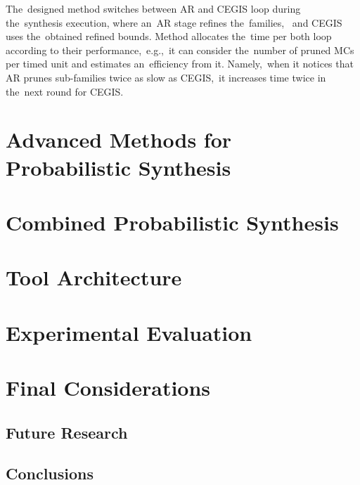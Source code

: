 The~designed method switches between AR and CEGIS loop during the~synthesis execution, where an~AR stage refines the~families, ~and CEGIS uses the~obtained refined bounds.
Method allocates the~time per both loop according to their performance,~e.g.,~it can consider the~number of pruned MCs per timed unit and estimates an~efficiency from it.
Namely,~when it notices that AR prunes sub-families twice as slow as CEGIS,~it increases time twice in the~next round for CEGIS.

\chapter{Advanced Methods for Probabilistic Synthesis}\label{chap:advanced}


\chapter{Combined Probabilistic Synthesis}\label{chap:combined}


\chapter{Tool Architecture}\label{chap:paynt}


\chapter{Experimental Evaluation}\label{chap:experiments}


\chapter{Final Considerations}\label{chap:conclusion}


\section{Future Research}
\section{Conclusions}
